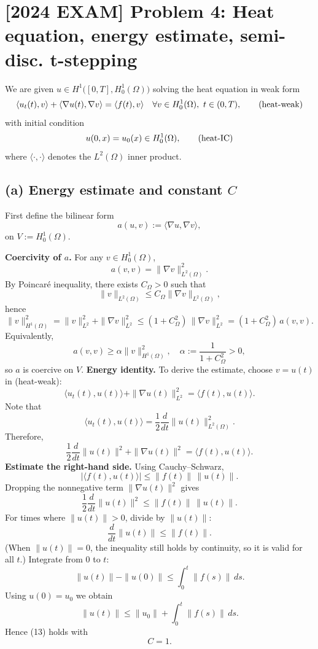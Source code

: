 \section*{[2024 EXAM] Problem 4: Heat equation, energy estimate, semi-disc. t-stepping}
We are given $u \in H^1\big([0,T],H_0^1(\Omega)\big)$ solving the heat equation in weak form
\[
    \langle u_t(t),v\rangle + \langle \nabla u(t),\nabla v\rangle
    = \langle f(t),v\rangle \quad \forall v\in H_0^1(\Omega),\ t\in(0,T), \tag{\text{heat-weak}}
\]
with initial condition
\[
    u(0,x) = u_0(x)\in H_0^1(\Omega), \tag{\text{heat-IC}}
\]
where $\langle\cdot,\cdot\rangle$ denotes the $L^2(\Omega)$ inner product.

\subsection*{(a) Energy estimate and constant $C$}
First define the bilinear form
\[
    a(u,v) := \langle \nabla u,\nabla v\rangle,
\]
on $V := H_0^1(\Omega)$.

\textbf{Coercivity of $a$.}
For any $v\in H_0^1(\Omega)$,
\[
    a(v,v) = \|\nabla v\|_{L^2(\Omega)}^2.
\]
By Poincaré inequality, there exists $C_\Omega>0$ such that
\[
    \|v\|_{L^2(\Omega)} \le C_\Omega \|\nabla v\|_{L^2(\Omega)},
\]
hence
\[
    \|v\|_{H^1(\Omega)}^2
    = \|v\|_{L^2}^2 + \|\nabla v\|_{L^2}^2
    \le (1+C_\Omega^2)\,\|\nabla v\|_{L^2}^2
    = (1+C_\Omega^2)\,a(v,v).
\]
Equivalently,
\[
    a(v,v) \ge \alpha \|v\|_{H^1(\Omega)}^2,\quad
    \alpha := \frac{1}{1+C_\Omega^2}>0,
\]
so $a$ is coercive on $V$.
\textbf{Energy identity.}
To derive the estimate, choose $v = u(t)$ in (heat-weak):
\[
    \langle u_t(t),u(t)\rangle + \|\nabla u(t)\|_{L^2}^2
    = \langle f(t),u(t)\rangle.
\]
Note that
\[
    \langle u_t(t),u(t)\rangle
    = \frac{1}{2}\frac{d}{dt}\|u(t)\|_{L^2(\Omega)}^2.
\]
Therefore,
\[
    \frac{1}{2}\frac{d}{dt}\|u(t)\|^2 + \|\nabla u(t)\|^2
    = \langle f(t),u(t)\rangle.
\]
\textbf{Estimate the right-hand side.}
Using Cauchy--Schwarz,
\[
    |\langle f(t),u(t)\rangle|
    \le \|f(t)\|\,\|u(t)\|.
\]
Dropping the nonnegative term $\|\nabla u(t)\|^2$ gives
\[
    \frac{1}{2}\frac{d}{dt}\|u(t)\|^2 \le \|f(t)\|\,\|u(t)\|.
\]
For times where $\|u(t)\|>0$, divide by $\|u(t)\|$:
\[
    \frac{d}{dt}\|u(t)\| \le \|f(t)\|.
\]
(When $\|u(t)\|=0$, the inequality still holds by continuity, so it is valid for all $t$.)
Integrate from $0$ to $t$:
\[
    \|u(t)\| - \|u(0)\|
    \le \int_0^t \|f(s)\|\,ds.
\]
Using $u(0)=u_0$ we obtain
\[
    \|u(t)\| \le \|u_0\| + \int_0^t \|f(s)\|\,ds.
\]
Hence (13) holds with
\[
    \boxed{C = 1.}
\]
